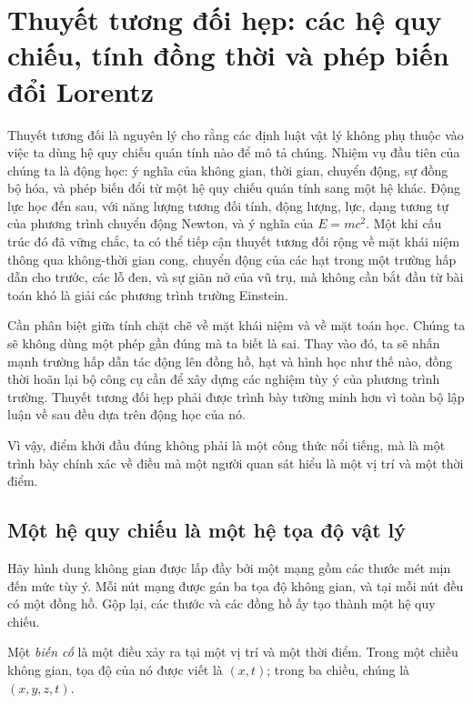 \chapter{Thuyết tương đối hẹp: các hệ quy chiếu, tính đồng thời và phép biến đổi Lorentz}

Thuyết tương đối là nguyên lý cho rằng các định luật vật lý không phụ thuộc vào việc ta dùng hệ quy chiếu quán tính nào để mô tả chúng. Nhiệm vụ đầu tiên của chúng ta là động học: ý nghĩa của không gian, thời gian, chuyển động, sự đồng bộ hóa, và phép biến đổi từ một hệ quy chiếu quán tính sang một hệ khác. Động lực học đến sau, với năng lượng tương đối tính, động lượng, lực, dạng tương tự của phương trình chuyển động Newton, và ý nghĩa của \(E=mc^2\). Một khi cấu trúc đó đã vững chắc, ta có thể tiếp cận thuyết tương đối rộng về mặt khái niệm thông qua không-thời gian cong, chuyển động của các hạt trong một trường hấp dẫn cho trước, các lỗ đen, và sự giãn nở của vũ trụ, mà không cần bắt đầu từ bài toán khó là giải các phương trình trường Einstein.

Cần phân biệt giữa tính chặt chẽ về mặt khái niệm và về mặt toán học. Chúng ta sẽ không dùng một phép gần đúng mà ta biết là sai. Thay vào đó, ta sẽ nhấn mạnh trường hấp dẫn tác động lên đồng hồ, hạt và hình học như thế nào, đồng thời hoãn lại bộ công cụ cần để xây dựng các nghiệm tùy ý của phương trình trường. Thuyết tương đối hẹp phải được trình bày tường minh hơn vì toàn bộ lập luận về sau đều dựa trên động học của nó.

Vì vậy, điểm khởi đầu đúng không phải là một công thức nổi tiếng, mà là một trình bày chính xác về điều mà một người quan sát hiểu là một vị trí và một thời điểm.

\section{Một hệ quy chiếu là một hệ tọa độ vật lý}

Hãy hình dung không gian được lấp đầy bởi một mạng gồm các thước mét mịn đến mức tùy ý. Mỗi nút mạng được gán ba tọa độ không gian, và tại mỗi nút đều có một đồng hồ. Gộp lại, các thước và các đồng hồ ấy tạo thành một hệ quy chiếu.

\begin{definition}
Một \emph{biến cố} là một điều xảy ra tại một vị trí và một thời điểm. Trong một chiều không gian, tọa độ của nó được viết là \((x,t)\); trong ba chiều, chúng là \((x,y,z,t)\).
\end{definition}

